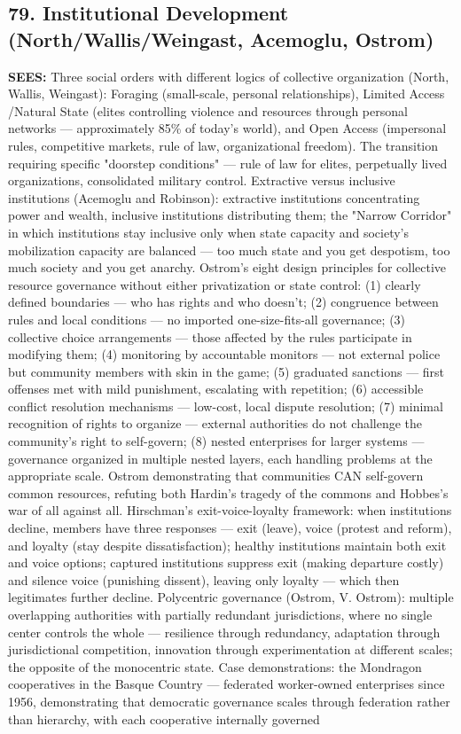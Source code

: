 \subsection*{79. Institutional Development (North/\allowbreak Wallis/\allowbreak Weingast, Acemoglu, Ostrom)}


\textbf{SEES:} Three social orders with different logics of collective organization (North, Wallis, Weingast): Foraging (small-scale, personal relationships), Limited Access /\allowbreak  Natural State (elites controlling violence and resources through personal networks — approximately 85\% of today's world), and Open Access (impersonal rules, competitive markets, rule of law, organizational freedom). The transition requiring specific "doorstep conditions" — rule of law for elites, perpetually lived organizations, consolidated military control. Extractive versus inclusive institutions (Acemoglu and Robinson): extractive institutions concentrating power and wealth, inclusive institutions distributing them; the "Narrow Corridor" in which institutions stay inclusive only when state capacity and society's mobilization capacity are balanced — too much state and you get despotism, too much society and you get anarchy. Ostrom's eight design principles for collective resource governance without either privatization or state control: (1) clearly defined boundaries — who has rights and who doesn't; (2) congruence between rules and local conditions — no imported one-size-fits-all governance; (3) collective choice arrangements — those affected by the rules participate in modifying them; (4) monitoring by accountable monitors — not external police but community members with skin in the game; (5) graduated sanctions — first offenses met with mild punishment, escalating with repetition; (6) accessible conflict resolution mechanisms — low-cost, local dispute resolution; (7) minimal recognition of rights to organize — external authorities do not challenge the community's right to self-govern; (8) nested enterprises for larger systems — governance organized in multiple nested layers, each handling problems at the appropriate scale. Ostrom demonstrating that communities CAN self-govern common resources, refuting both Hardin's tragedy of the commons and Hobbes's war of all against all. Hirschman's exit-voice-loyalty framework: when institutions decline, members have three responses — exit (leave), voice (protest and reform), and loyalty (stay despite dissatisfaction); healthy institutions maintain both exit and voice options; captured institutions suppress exit (making departure costly) and silence voice (punishing dissent), leaving only loyalty — which then legitimates further decline. Polycentric governance (Ostrom, V. Ostrom): multiple overlapping authorities with partially redundant jurisdictions, where no single center controls the whole — resilience through redundancy, adaptation through jurisdictional competition, innovation through experimentation at different scales; the opposite of the monocentric state. Case demonstrations: the Mondragon cooperatives in the Basque Country — federated worker-owned enterprises since 1956, demonstrating that democratic governance scales through federation rather than hierarchy, with each cooperative internally governed 